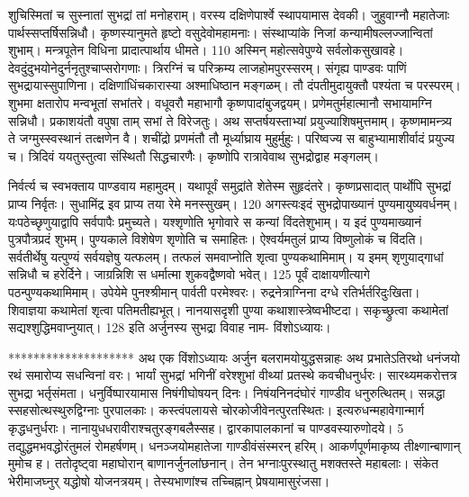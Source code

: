 शुचिस्मितां च सुस्नातां सुभद्रां तां मनोहराम्।
 वरस्य दक्षिणेपार्श्वे स्थापयामास देवकी।
 जुहुवाग्नौ महातेजाः पार्थस्सप्तर्षिसन्निधौ।
 कृष्णस्यानुमते हृष्टो वसुदेवोमहामनाः।
 संस्थाप्यांके निजां कन्यामीषल्लज्जान्वितां शुभाम्।
 मन्त्रपूतेन विधिना प्रादात्पार्थाय धीमते।
 110 अस्मिन् महोत्सवेपुण्ये सर्वलोकसुखावहे।
 देवदुंदुभयोनेदुर्ननृतुश्चाप्सरोगणाः।
 त्रिरग्निं च परिक्रम्य लाजहोमपुरस्सरम्।
 संगृह्य पाण्डवः पाणिं सुभद्रायास्सुपाणिना।
 दक्षिणांधिंचकारास्या अश्माधिष्ठान मङ्गळम्।
 तौ दंपतीमुदायुक्तौ पश्यंता च परस्परम्।
 शुभमा क्षतारोप मन्वभूतां सभांतरे।
 वधूवरौ महाभागौ कृष्णपादांबुजद्वयम्।
 प्रणेमतुर्महात्मानौ सभायामग्नि सन्निधौ।
 प्रकाशयंतौ वपुषा ताम् सभां ते विरेजतुः।
 अथ सप्तर्षयस्ताभ्यां प्रयुज्याशिषमुत्तमाम्।
 कृष्णमामन्त्र्य ते जग्मुस्स्वस्थानं तत्क्षणेन वै।
 शचींद्रो प्रणमंतौ तौ मूर्ध्याघ्राय मुहुर्मुहुः।
 परिष्वज्य स बाहुभ्यामाशीर्वादं प्रयुज्य च।
 त्रिदिवं ययतुस्तुत्वा संस्थितौ सिद्धचारणैः।
 कृष्णोपि रात्रावेवाथ सुभद्रोद्वाह मङ्गलम्।
 
निर्वर्त्य च स्वभक्ताय पाण्डवाय महामुदम्।
 यथापूर्वं समुद्रांते शेतेस्म सुहृदंतरे।
 कृष्णप्रसादात् पार्थोपि सुभद्रां प्राप्य निर्वृतः।
 सुधामिंद्र इव प्राप्य तया रेमे मनस्सुखम्।
 120 अगस्त्यःइदं सुभद्रोपाख्यानं पुण्यमायुष्यवर्धनम्।
 यःपठेच्छृणुयाद्वापि सर्वपापैः प्रमुच्यते।
 यश्शृणोति भृगोवारे स कन्यां विंदतेशुभाम्।
 य इदं पुण्यमाख्यानं पुत्रपौत्रप्रदं शुभम्।
 पुण्यकाले विशेषेण शृणोति च समाहितः।
 ऐश्वर्यमतुलं प्राप्य विष्णुलोकं च विंदति।
 सर्वतीर्थेषु यत्पुण्यं सर्वयज्ञेषु यत्फलम्।
 तत्फलं समवाप्नोति शृत्वा पुण्यकथामिमाम्।
 य इमम् शृणुयाद्गाधां सन्निधौ च हरेर्दिने।
 जाग्रन्निशि स धर्मात्मा शुकवद्वैष्णवो भवेत्।
 125 पूर्वं दाक्षायणीत्यागे पठन्पुण्यकथामिमाम्।
 उपेयेमे पुनश्श्रीमान् पार्वती परमेश्वरः।
 रुद्रनेत्राग्निना दग्धे रतिर्भर्तरिदुःखिता।
 शिवाज्ञया कथामेतां शृत्वा पतिमतीह्यभूत्।
 नानयासदृशी पुण्या कथाशास्त्रेष्वभीष्टदा।
 सकृच्छ्रुत्वा कथामेतां सद्यश्शुद्धिमवाप्नुयात्।
 128 इति अर्जुनस्य सुभद्रा विवाह नाम- विंशोऽध्यायः।
 
********************
अथ एक विंशोऽध्यायः
अर्जुन बलरामयोयुद्धसन्नाहः अथ प्रभातेऽतिरथो धनंजयो रथं
समारोप्य सधन्विनां वरः।
 भार्यां सुभद्रां भगिनीं वरेश्शुभां वीथ्यां
प्रतस्थे कवचीधनुर्धरः।
 सारथ्यमकरोत्तत्र सुभद्रा भर्तृसंमता।
 धनुर्विष्पारयामास निषंगीघोषयन् दिनः।
 निषंयनिनदंघोरं गाण्डीव धनुरुत्थितम्।
 सन्नद्धा स्सहसोत्थस्थुरुद्विग्नाः पुरपालकाः।
 कस्त्वंपलायसे चोरकोजीवेनत्पुरतस्थितः।
 इत्यरुधन्महावेगान्मार्ग कृद्धधनुर्धराः।
 नानायुधधरावीराश्चतुरङ्गबलैस्सह।
 द्वारकापालकानां च पाण्डवस्यारुणोदये।
 5 तद्युद्धमभवद्धोरंतुमलं रोमहर्षणम्।
 धनञ्जयोमहातेजा गाण्डीवंसंस्मरन् हरिम्।
 आकर्णपूर्णमाकृष्य तीक्ष्णान्बाणान् मुमोच ह।
 ततोदृष्ट्वा महाघोरान् बाणानर्जुनलांछनान्।
 तेन भग्नाःपुरस्थातु मशक्तस्ते महाबलाः।
 संकेत भेरीमाजघ्नुर् यद्धोषो योजनत्रयम्।
 तेस्यभाणांश्च तच्चिह्नान् प्रेषयामासुरंजसा।
 
